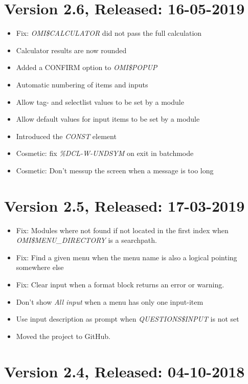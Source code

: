 \documentclass[a4paper]{book}
\begin{document}
\section*{Version 2.6, Released: 16-05-2019}

\begin{itemize}
\item Fix: \textsl{OMI{\$}CALCULATOR} did not pass the full calculation
\item Calculator results are now rounded
\item Added a CONFIRM option to \textsl{OMI{\$}POPUP}
\item Automatic numbering of items and inputs
\item Allow tag- and selectlist values to be set by a module
\item Allow default values for input items to be set by a module
\item Introduced the \textsl{CONST} element
\item Cosmetic: fix \textsl{\%DCL-W-UNDSYM} on exit in batchmode
\item Cosmetic: Don't messup the screen when a message is too long
\end{itemize}

\section*{Version 2.5, Released: 17-03-2019}

\begin{itemize}
\item Fix: Modules where not found if not located in the first index when \textsl{OMI{\$}MENU{\_}DIRECTORY} is a searchpath.
\item Fix: Find a given menu when the menu name is also a logical pointing somewhere else
\item Fix: Clear input when a format block returns an error or warning.
\item Don't show \textsl{All input} when a menu has only one input-item
\item Use input description as prompt when \textsl{QUESTIONS{\$}INPUT} is not set
\item Moved the project to GitHub.
\end{itemize}

\section*{Version 2.4, Released: 04-10-2018}
\end{document}

